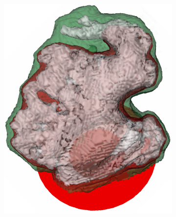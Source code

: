 \documentclass[review]{elsarticle}
\begin{document}
\begin{figure}[t]
  \centering
  \begin{subfigure}[b]{.18\linewidth}
    \centering
    \includegraphics[width=\textwidth]{fig15_1.png}
    \caption{}
  \end{subfigure}%
  \begin{subfigure}[b]{.18\linewidth}
    \centering

\end{subfigure}
\end{figure}
\end{document}
